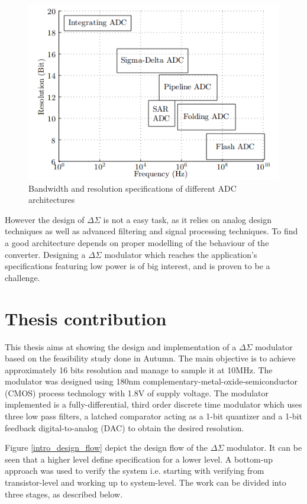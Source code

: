 \begin{figure}[H]
\centering
\includegraphics[scale = 0.7]{images/compare_adc.png}
\caption{Bandwidth and resolution specifications of different ADC architectures}
\label{comp_asdc}
\end{figure}

However the design of $\Delta\Sigma$ is not a easy task, as it relies on analog design techniques as well as advanced filtering and signal  processing techniques. To find a good architecture depends on proper modelling of the behaviour of the converter. Designing a $\Delta\Sigma$ modulator which reaches the application's specifications featuring low power is of big interest, and is proven to be a challenge. 

\section{Thesis contribution}
This thesis aims at showing the design and implementation of a $\Delta\Sigma$ modulator based on the feasibility study\cite{for_pro} done in Autumn. The main objective is to achieve approximately 16 bits resolution and manage to sample it at 10MHz. The modulator was designed using 180nm complementary-metal-oxide-semiconductor (CMOS) process technology with 1.8V of supply voltage. The modulator implemented is a fully-differential, third order discrete time modulator which uses three low pass filters, a latched comparator acting as a 1-bit quantizer and a 1-bit feedback digital-to-analog (DAC) to obtain the desired resolution. 

Figure \ref{intro_design_flow} depict the design flow of the $\Delta\Sigma$ modulator. It can be seen that a higher level define specification for a lower level. A bottom-up approach was used to verify the system i.e. starting with verifying from transistor-level and working up to system-level. The work can be divided into three stages, as described below.  



